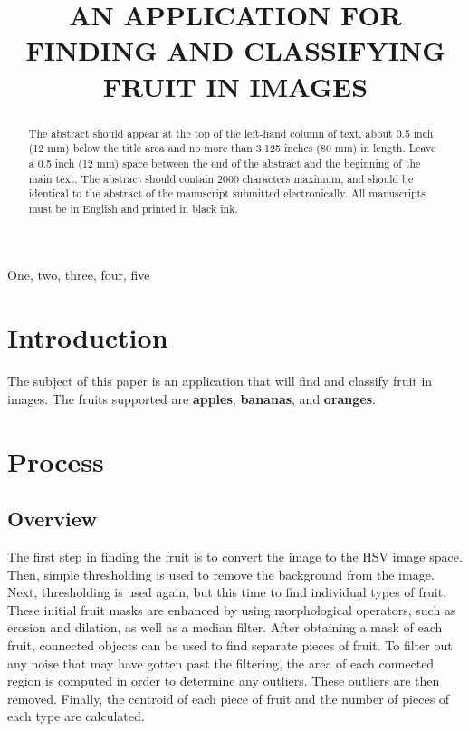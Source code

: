 \documentclass{article}
\begin{document}
\sloppy

\def\x{{\mathbf x}}
\def\L{{\cal L}}


\title{AN APPLICATION FOR FINDING AND CLASSIFYING FRUIT IN IMAGES}
%
\address{Rose-Hulman Institute of Technology}


\maketitle
\thispagestyle{fancy} \fancyhead{} \lhead{}
\renewcommand{\headrulewidth}{0pt}
\renewcommand{\footrulewidth}{0pt}




%
\begin{abstract}
The abstract should appear at the top of the left-hand column of
text, about 0.5 inch (12 mm) below the title area and no more than
3.125 inches (80 mm) in length.  Leave a 0.5 inch (12 mm) space
between the end of the abstract and the beginning of the main text.
The abstract should contain 2000 characters maximum, and should be
identical to the abstract of the manuscript submitted
electronically. All manuscripts must be in English and printed in
black ink.
\end{abstract}
%
\begin{keywords}
One, two, three, four, five
\end{keywords}
%
\section{Introduction}
\label{sec:intro}

The subject of this paper is an application that will find and classify fruit in images.
The fruits supported are \textbf{apples}, \textbf{bananas}, and \textbf{oranges}.


\section{Process}
\label{sec:process}
\subsection{Overview}
\label{subsec:process:overview}

The first step in finding the fruit is to convert the image to the HSV image space.  Then, simple thresholding is used to remove the background from the image.  Next, thresholding is used again, but this time to find individual types of fruit.  These initial fruit masks are enhanced by using morphological operators, such as erosion and dilation, as well as a median filter.  After obtaining a mask of each fruit, connected objects can be used to find separate pieces of fruit.  To filter out any noise that may have gotten past the filtering, the area of each connected region is computed in order to determine any outliers.  These outliers are then removed.  Finally, the centroid of each piece of fruit and the number of pieces of each type are calculated.
\end{document}
